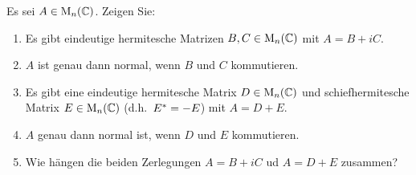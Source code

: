 \documentclass[a4paper, 10pt]{scrartcl}
\begin{document}





\begin{question}[subtitle = Zerlegung von Matrizen]
  Es sei $A \in \operatorname{M}_{n}(\mathbb{C})$.
  Zeigen Sie:
  \begin{enumerate}
    \item
      Es gibt eindeutige hermitesche Matrizen $B, C \in \operatorname{M}_{n}(\mathbb{C})$ mit $A = B + i C$.
    \item
      $A$ ist genau dann normal, wenn $B$ und $C$ kommutieren.
    \item
      Es gibt eine eindeutige hermitesche Matrix $D \in \operatorname{M}_{n}(\mathbb{C})$ und schiefhermitesche Matrix $E \in \operatorname{M}_{n}(\mathbb{C})$ (d.h.\ $E^* = -E$) mit $A = D + E$.
    \item
      $A$ genau dann normal ist, wenn $D$ und $E$ kommutieren.
    \item
      Wie hängen die beiden Zerlegungen $A = B + iC$ ud $A = D + E$ zusammen?
  \end{enumerate}
\end{question}





\end{document}
